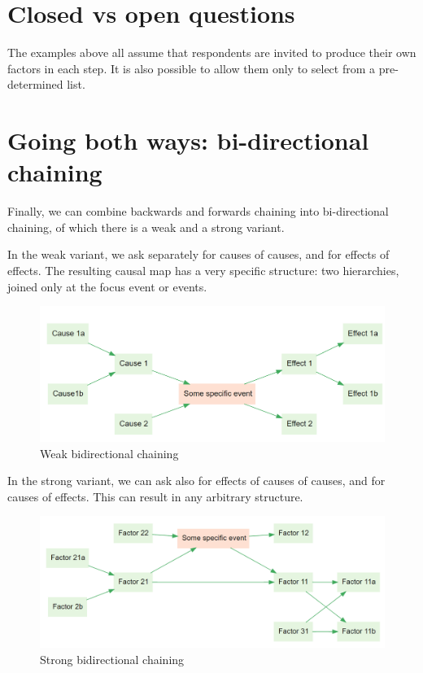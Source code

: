 \documentclass[
]{book}
\begin{document}
\hypertarget{closed-vs-open-questions}{%
\section{Closed vs open questions}\label{closed-vs-open-questions}}

The examples above all assume that respondents are invited to produce their own factors in each step. It is also possible to allow them only to select from a pre-determined list. \citep{hodgkinson2004}

\hypertarget{going-both-ways-bi-directional-chaining}{%
\section{Going both ways: bi-directional chaining}\label{going-both-ways-bi-directional-chaining}}

Finally, we can combine backwards and forwards chaining into bi-directional chaining, of which there is a weak and a strong variant.

In the weak variant, we ask separately for causes of causes, and for effects of effects. The resulting causal map has a very specific structure: two hierarchies, joined only at the focus event or events.

\begin{figure}
\centering
\includegraphics{_assets/image-20210215094522576.png}
\caption{Weak bidirectional chaining}
\end{figure}

In the strong variant, we can ask also for effects of causes of causes, and for causes of effects. This can result in any arbitrary structure.

\begin{figure}
\centering
\includegraphics{_assets/image-20210215094737856.png}
\caption{Strong bidirectional chaining}
\end{figure}
\end{document}
